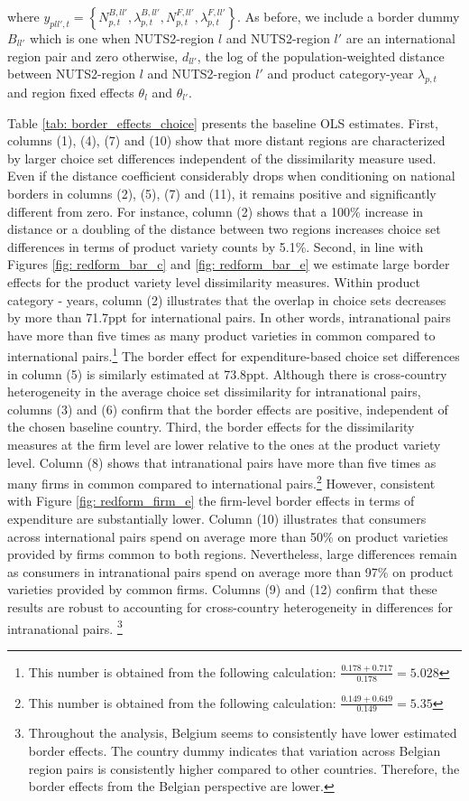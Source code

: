 where $y_{pll',t} = \left\{N^{B,ll'}_{p,t},\lambda^{B,ll'}_{p,t},N^{F,ll'}_{p,t},\lambda^{F,ll'}_{p,t}\right\}$. As before, we include a border dummy $B_{ll'}$ which is one when NUTS2-region $l$ and NUTS2-region $l'$ are an international region pair and zero otherwise, $d_{ll'}$, the log of the population-weighted distance between NUTS2-region $l$ and NUTS2-region $l'$ and product category-year $\lambda_{p,t}$ and region fixed effects $\theta_l$ and $\theta_{l'}$. 

Table \ref{tab: border_effects_choice} presents the baseline OLS estimates. First, columns (1), (4), (7) and (10) show that more distant regions are characterized by larger choice set differences independent of the dissimilarity measure used. Even if the distance coefficient considerably drops when conditioning on national borders in columns (2), (5), (7) and (11), it remains positive and significantly different from zero. For instance, column (2) shows that a 100\% increase in distance or a doubling of the distance between two regions increases choice set differences in terms of product variety counts by 5.1\%. Second, in line with Figures \ref{fig: redform_bar_c} and \ref{fig: redform_bar_e} we estimate large border effects for the product variety level dissimilarity measures. Within product category - years, column (2) illustrates that the overlap in choice sets decreases by more than 71.7ppt for international pairs. In other words, intranational pairs have more than five times as many product varieties in common compared to international pairs.\footnote{This number is obtained from the following calculation: $\frac{0.178+0.717}{0.178} = 5.028$} The border effect for expenditure-based choice set differences in column (5) is similarly estimated at 73.8ppt. Although there is cross-country heterogeneity in the average choice set dissimilarity for intranational pairs, columns (3) and (6) confirm that the border effects are positive, independent of the chosen baseline country. Third, the border effects for the dissimilarity measures at the firm level are lower relative to the ones at the product variety level. Column (8) shows that intranational pairs have more than five times as many firms in common compared to international pairs.\footnote{This number is obtained from the following calculation: $\frac{0.149+0.649}{0.149} = 5.35$} However, consistent with Figure \ref{fig: redform_firm_e} the firm-level border effects in terms of expenditure are substantially lower. Column (10) illustrates that consumers across international pairs spend on average more than 50\% on product varieties provided by firms common to both regions. Nevertheless, large differences remain as consumers in intranational pairs spend on average more than 97\% on product varieties provided by common firms. Columns (9) and (12) confirm that these results are robust to accounting for cross-country heterogeneity in differences for intranational pairs. \footnote{Throughout the analysis, Belgium seems to consistently have lower estimated border effects. The country dummy indicates that variation across Belgian region pairs is consistently higher compared to other countries. Therefore, the border effects from the Belgian perspective are lower.}

